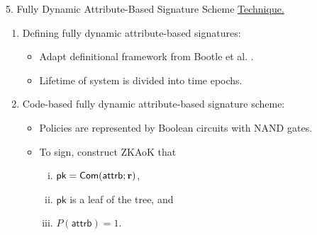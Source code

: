 \begin{frame}{5. Fully Dynamic Attribute-Based Signature Scheme}
	\underline{Technique.}\pause
	\begin{enumerate}
		\item Defining fully dynamic attribute-based signatures:\pause
		\begin{itemize}
			\item Adapt definitional framework from Bootle et al. \cite{BootleCCGG16}.\pause
			\item Lifetime of system is divided into time epochs.\pause
		\end{itemize}
		\item Code-based fully dynamic attribute-based signature scheme:\pause
		\begin{itemize}
			\item Policies are represented by Boolean circuits with NAND gates.\pause
			\item To sign, construct ZKAoK that \pause
			\begin{enumerate}[(i)]
				\item $\textsf{pk}=\mathsf{Com }(\textsf{attrb};\mathbf{r})$,\\ \pause
				\item $\textsf{pk}$ is a leaf of the tree, and\\ \pause
				\item $P(\textsf{attrb}) = 1$.
			\end{enumerate} 
		\end{itemize}
	\end{enumerate}
\end{frame}